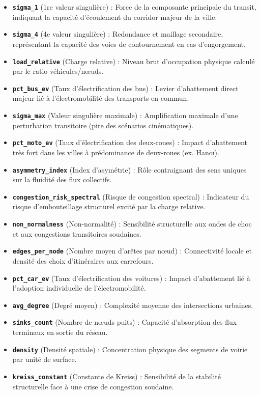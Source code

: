 \documentclass[10pt, a4paper]{article}
\begin{document}
\begin{itemize}
\item
  \textbf{\texttt{sigma\_1}} (1re valeur singulière) : Force de la
  composante principale du transit, indiquant la capacité d'écoulement
  du corridor majeur de la ville.
\item
  \textbf{\texttt{sigma\_4}} (4e valeur singulière) : Redondance et
  maillage secondaire, représentant la capacité des voies de
  contournement en cas d'engorgement.
\item
  \textbf{\texttt{load\_relative}} (Charge relative) : Niveau brut
  d'occupation physique calculé par le ratio véhicules/nœuds.
\item
  \textbf{\texttt{pct\_bus\_ev}} (Taux d'électrification des bus) :
  Levier d'abattement direct majeur lié à l'électromobilité des
  transports en commun.
\item
  \textbf{\texttt{sigma\_max}} (Valeur singulière maximale) :
  Amplification maximale d'une perturbation transitoire (pire des
  scénarios cinématiques).
\item
  \textbf{\texttt{pct\_moto\_ev}} (Taux d'électrification des
  deux-roues) : Impact d'abattement très fort dans les villes à
  prédominance de deux-roues (ex. Hanoï).
\item
  \textbf{\texttt{asymmetry\_index}} (Index d'asymétrie) : Rôle
  contraignant des sens uniques sur la fluidité des flux collectifs.
\item
  \textbf{\texttt{congestion\_risk\_spectral}} (Risque de congestion
  spectral) : Indicateur du risque d'embouteillage structurel excité par
  la charge relative.
\item
  \textbf{\texttt{non\_normalness}} (Non-normalité) : Sensibilité
  structurelle aux ondes de choc et aux congestions transitoires
  soudaines.
\item
  \textbf{\texttt{edges\_per\_node}} (Nombre moyen d'arêtes par nœud) :
  Connectivité locale et densité des choix d'itinéraires aux carrefours.
\item
  \textbf{\texttt{pct\_car\_ev}} (Taux d'électrification des voitures) :
  Impact d'abattement lié à l'adoption individuelle de
  l'électromobilité.
\item
  \textbf{\texttt{avg\_degree}} (Degré moyen) : Complexité moyenne des
  intersections urbaines.
\item
  \textbf{\texttt{sinks\_count}} (Nombre de nœuds puits) : Capacité
  d'absorption des flux terminaux en sortie du réseau.
\item
  \textbf{\texttt{density}} (Densité spatiale) : Concentration physique
  des segments de voirie par unité de surface.
\item
  \textbf{\texttt{kreiss\_constant}} (Constante de Kreiss) : Sensibilité
  de la stabilité structurelle face à une crise de congestion soudaine.
\end{itemize}
\end{document}
